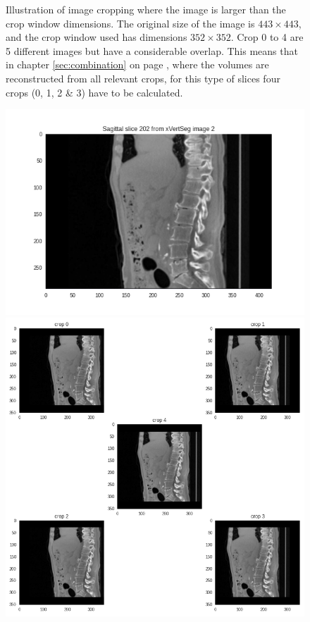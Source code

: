 \begin{figure}
\begin{minipage}{0.99\textwidth}
    \end{minipage}
    \caption{
        Illustration of image cropping where the image is larger than the crop window dimensions. The original size of the image is $443 \times 443$, and the crop window used has dimensions $352 \times 352$.
        Crop 0 to 4 are 5 different images but have a considerable overlap. This means that in chapter \ref{sec:combination} on page \pageref{sec:combination}, 
        where the volumes are reconstructed from all relevant crops, for this type of slices four crops (0, 1, 2 \& 3) have to be calculated.\label{fig:crop}
        }
    
\end{figure}

\begin{figure}
    \centering
    \begin{minipage}{.99\textwidth}
        \includegraphics[width=.99\textwidth]{images/slice202.png}
    \end{minipage} 
    \begin{minipage}{0.99\textwidth}
        \includegraphics[width=.99\textwidth]{images/cropping_slice202.png}

\end{minipage}
\end{figure}
